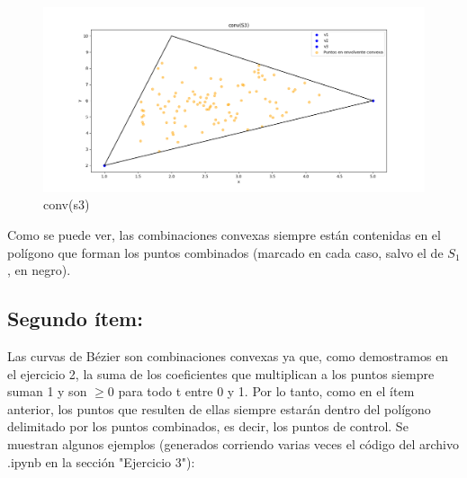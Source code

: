 \documentclass{article}
\begin{document}
\begin{figure}[H]
\begin{minipage}{0.45\textwidth}
        \centering
        \includegraphics[width=\textwidth]{imagenes/conv(s3).png}
        \caption{conv(s3)}
        \label{fig:grafico3}
    \end{minipage}
    \label{fig:tres_graficos}
\end{figure}

Como se puede ver, las combinaciones convexas siempre están contenidas en el polígono que forman los puntos combinados (marcado en cada caso, salvo el de $S_1$, en negro).

\subsection*{Segundo ítem:}
Las curvas de Bézier son combinaciones convexas ya que, como demostramos en el ejercicio 2, la suma de los coeficientes que multiplican a los puntos siempre suman 1 y son $\geq 0$ para todo t entre 0 y 1. Por lo tanto, como en el ítem anterior, los puntos que resulten de ellas siempre estarán dentro del polígono delimitado por los puntos combinados, es decir, los puntos de control. Se muestran algunos ejemplos (generados corriendo varias veces el código del archivo .ipynb en la sección "Ejercicio 3"):
\end{document}
